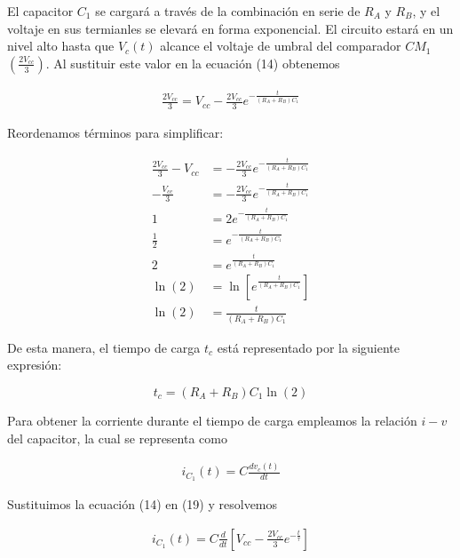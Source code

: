 \documentclass{article}
\begin{document}
\noindent El capacitor $C_1$ se cargará a través de la combinación en serie de $R_A$ y $R_B$, y el voltaje en sus termianles se elevará en forma exponencial. El circuito estará en un nivel alto hasta que $V_c(t)$ alcance el voltaje de umbral del comparador $CM_1$ $(\frac{2V_{cc}}{3})$. Al sustituir este valor en la ecuación (14) obtenemos

\begin{align}
	\frac{2V_{cc}}{3} = V_{cc} - \frac{2V_{cc}}{3}e^{-\frac{t}{(R_A + R_B)C_1}}
\end{align}

\noindent Reordenamos términos para simplificar:

\begin{align}
	\frac{2V_{cc}}{3} - V_{cc}  &= -\frac{2V_{cc}}{3}e^{-\frac{t}{(R_A + R_B)C_1}} \nonumber \\
	-\frac{V_{cc}}{3} &= -\frac{2V_{cc}}{3}e^{-\frac{t}{(R_A + R_B)C_1}} \nonumber \\
	1 &= 2e^{-\frac{t}{(R_A + R_B)C_1}} \nonumber \\
	\frac{1}{2} &= e^{-\frac{t}{(R_A + R_B)C_1}} \nonumber \\
	2 &= e^{\frac{t}{(R_A + R_B)C_1}} \nonumber \\
	\ln(2) &= \ln \left[ e^{\frac{t}{(R_A + R_B)C_1}} \right]  \nonumber \\
	\ln(2) &= \frac{t}{(R_A + R_B)C_1}  
\end{align}

\noindent De esta manera, el tiempo de carga $t_c$ está representado por la siguiente expresión:

\begin{tcolorbox}[colback=red!5!white,colframe=red!75!black,arc=0mm,boxrule=0mm,width=(\linewidth+0.5cm)]
\begin{equation}
	t_c = (R_A + R_B)C_1 \ln(2)
\end{equation}
\end{tcolorbox}


\noindent Para obtener la corriente durante el tiempo de carga empleamos la relación $i-v$ del capacitor, la cual se representa como

\begin{align}
	i_{C_1}(t) = C \frac{dv_c(t)}{dt}
\end{align}

\noindent Sustituimos la ecuación (14) en (19) y resolvemos

\begin{align}
	i_{C_1}(t) = C \frac{d}{dt} \left[ V_{cc} - \frac{2V_{cc}}{3}e^{-\frac{t}{\tau}} \right]
\end{align}
\end{document}

